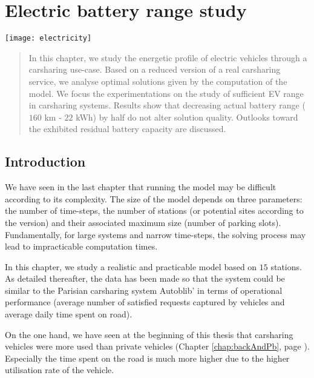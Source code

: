 \chapter{Electric battery range study} \label{chap:slpEnergyExp}
\minitoc
\vfill
\noindent
\begin{minipage}[c]{.3\linewidth}
\texttt{[image: electricity]}
\end{minipage}
\hfill
\begin{minipage}[c]{.7\linewidth}
\begin{abstract}
In this chapter, we study the energetic profile of electric vehicles through a carsharing use-case.
Based on a reduced version of a real carsharing service, we analyse optimal solutions given by the computation of the {\ENERGY} model.
We focus the experimentations on the study of sufficient EV range in carsharing systems.
Results show that decreasing actual battery range ($160$ km - $22$ kWh) by half do not alter solution quality.
Outlooks toward the exhibited residual battery capacity are discussed.
\end{abstract}
\end{minipage}

\newpage
\section{Introduction}
We have seen in the last chapter that running the {\ENERGY} model may be difficult according to its complexity.
The size of the model depends on three parameters: the number of time-steps, the number of stations (or potential sites according to the version) and their associated maximum size (number of parking slots).
Fundamentally, for large systems and narrow time-steps, the solving process may lead to impracticable computation times.

\medskip
In this chapter, we study a realistic and practicable model based on $15$ stations.
As detailed thereafter, the data has been made so that the system could be similar to the Parisian carsharing system Autoblib' in terms of operational performance (average number of satisfied requests captured by vehicles and average daily time spent on road).

On the one hand, we have seen at the beginning of this thesis that carsharing vehicles were more used than private vehicles (\see Chapter \ref{chap:backAndPb}, page \pageref{urbanMobility}).
Especially the time spent on the road is much more higher due to the higher utilisation rate of the vehicle.

